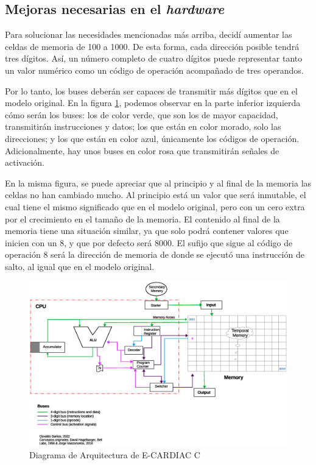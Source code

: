 \documentclass[letterpaper,12pt,oneside]{book}
\begin{document}
		\subsection{Mejoras necesarias en el \textit{hardware}}
		
		Para solucionar las necesidades mencionadas más arriba, decidí aumentar las celdas de memoria de 100 a 1000. De esta forma, cada dirección posible tendrá
		tres dígitos. Así, un número completo de cuatro dígitos puede representar tanto un valor numérico como un código de operación acompañado de tres operandos.
  
        Por lo tanto, los buses deberán ser capaces de transmitir más dígitos que en el modelo original. En la figura \ref{fig:diagarquiConc}, 
		podemos observar
		en la parte inferior izquierda cómo serán los buses: los de color verde, que son los de mayor capacidad, transmitirán instrucciones y datos; los
		que están en color morado, solo las direcciones; y los que están en color azul, únicamente los códigos de operación. Adicionalmente, hay unos buses
		en color rosa que transmitirán señales de activación.
  
        En la misma figura, se puede apreciar que al principio y al final de la memoria las celdas no han cambiado
		mucho. Al principio está un valor que será inmutable, el cual tiene el mismo significado que en el modelo original, pero con un cero extra por el crecimiento
		en el tamaño de la memoria. El contenido al final de la memoria tiene una situación similar, ya que solo podrá contener valores que inicien con un $8$, y
		que por defecto será $8000$. El sufijo que sigue al código de operación $8$ será la dirección de memoria de donde se ejecutó una instrucción de 
		salto, al igual que en el modelo original.
				
		\begin{figure}[h]		
			\centering
			\includegraphics[scale=0.48]{media/CARDIACC/Arquitectura_diagrama_concurrente.eps}
			\caption{Diagrama de Arquitectura de E-CARDIAC C}
			\label{fig:diagarquiConc}
		\end{figure}
		
\end{document}
